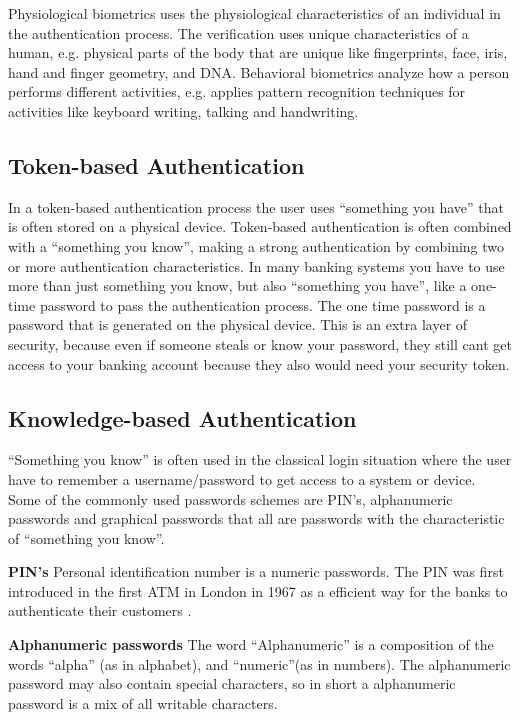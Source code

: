      Physiological biometrics uses the physiological characteristics of an individual in the authentication process. The verification uses unique characteristics of a human, e.g. physical parts of the body that are unique like fingerprints, face, iris, hand and finger geometry, and DNA. Behavioral biometrics analyze how a person performs different activities, e.g. applies pattern recognition techniques for activities like keyboard writing, talking and handwriting.

    \subsection{Token-based Authentication}
    In a token-based authentication process the user uses ``something you have'' that is often stored on a physical device. Token-based authentication is often combined with a ``something you know'', making a strong authentication by combining two or more authentication characteristics. In many banking systems you have to use more than just something you know, but also ``something you have'', like a one-time password to pass the authentication process. The one time password is a password that is generated on the physical device. This is an extra layer of security, because even if someone steals or know your password, they still cant get access to your banking account because they also would need your security token.

    

    \subsection{Knowledge-based Authentication}
    ``Something you know'' is often used in the classical login situation where the user have to remember a username/password to get access to a system or device. Some of the commonly used passwords schemes are PIN's, alphanumeric passwords and graphical passwords that all are passwords with the characteristic of ``something you know''.

      {\bf PIN's} Personal identification number is a numeric passwords. The PIN was first introduced in the first ATM in London in 1967 as a efficient way for the banks to authenticate their customers \cite{Bonneau1}.      

      {\bf Alphanumeric passwords}
      The word ``Alphanumeric'' is a composition of the words ``alpha'' (as in alphabet), and ``numeric''(as in numbers). The alphanumeric password may also contain special characters, so in short a alphanumeric password is a mix of all writable characters.

